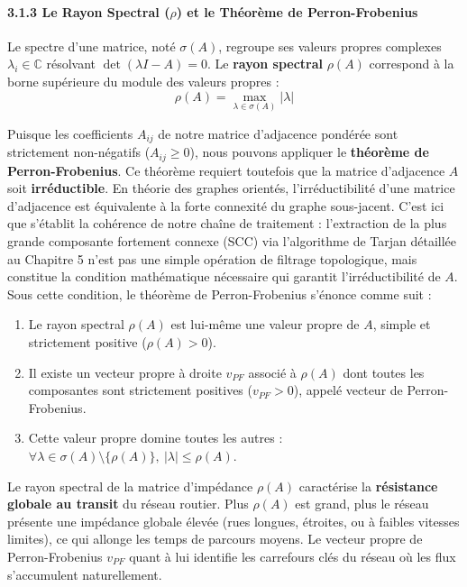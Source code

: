 \documentclass[10pt, a4paper]{article}
\providecommand{\tightlist}{}
\begin{document}
\paragraph{\texorpdfstring{3.1.3 Le Rayon Spectral (\(\rho\)) et le
Théorème de
Perron-Frobenius}{3.1.3 Le Rayon Spectral (\textbackslash rho) et le Théorème de Perron-Frobenius}}\label{le-rayon-spectral-rho-et-le-thuxe9oruxe8me-de-perron-frobenius}

Le spectre d'une matrice, noté \(\sigma(A)\), regroupe ses valeurs
propres complexes \(\lambda_i \in \mathbb{C}\) résolvant
\(\det(\lambda I - A) = 0\). Le \textbf{rayon spectral} \(\rho(A)\)
correspond à la borne supérieure du module des valeurs propres :
\[\rho(A) = \max_{\lambda \in \sigma(A)} |\lambda|\]

Puisque les coefficients \(A_{ij}\) de notre matrice d'adjacence
pondérée sont strictement non-négatifs (\(A_{ij} \ge 0\)), nous pouvons
appliquer le \textbf{théorème de Perron-Frobenius}. Ce théorème requiert
toutefois que la matrice d'adjacence \(A\) soit \textbf{irréductible}.
En théorie des graphes orientés, l'irréductibilité d'une matrice
d'adjacence est équivalente à la forte connexité du graphe sous-jacent.
C'est ici que s'établit la cohérence de notre chaîne de traitement :
l'extraction de la plus grande composante fortement connexe (SCC) via
l'algorithme de Tarjan détaillée au Chapitre 5 n'est pas une simple
opération de filtrage topologique, mais constitue la condition
mathématique nécessaire qui garantit l'irréductibilité de \(A\). Sous
cette condition, le théorème de Perron-Frobenius s'énonce comme suit :

\begin{enumerate}
\def\labelenumi{\arabic{enumi}.}
\tightlist
\item
  Le rayon spectral \(\rho(A)\) est lui-même une valeur propre de \(A\),
  simple et strictement positive (\(\rho(A) > 0\)).
\item
  Il existe un vecteur propre à droite \(v_{PF}\) associé à \(\rho(A)\)
  dont toutes les composantes sont strictement positives
  (\(v_{PF} > 0\)), appelé vecteur de Perron-Frobenius.
\item
  Cette valeur propre domine toutes les autres :
  \(\forall \lambda \in \sigma(A) \setminus \{\rho(A)\}, \ |\lambda| \le \rho(A)\).
\end{enumerate}

Le rayon spectral de la matrice d'impédance \(\rho(A)\) caractérise la
\textbf{résistance globale au transit} du réseau routier. Plus
\(\rho(A)\) est grand, plus le réseau présente une impédance globale
élevée (rues longues, étroites, ou à faibles vitesses limites), ce qui
allonge les temps de parcours moyens. Le vecteur propre de
Perron-Frobenius \(v_{PF}\) quant à lui identifie les carrefours clés du
réseau où les flux s'accumulent naturellement.
\end{document}
